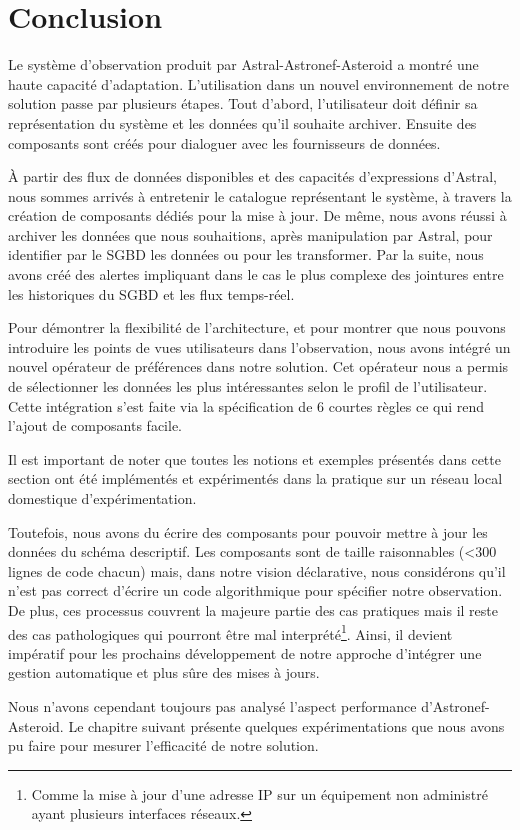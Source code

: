\section{Conclusion}\label{sec:valid:domvision:conclusion}
Le système d'observation produit par Astral-Astronef-Asteroid a montré une haute capacité d'adaptation. L'utilisation dans un nouvel environnement de notre solution passe par plusieurs étapes. Tout d'abord, l'utilisateur doit définir sa représentation du système et les données qu'il souhaite archiver. Ensuite des composants sont créés pour dialoguer avec les fournisseurs de données. 

À partir des flux de données disponibles et des capacités d'expressions d'Astral, nous sommes arrivés à entretenir le catalogue représentant le système, à travers la création de composants dédiés pour la mise à jour. De même, nous avons réussi à archiver les données que nous souhaitions, après manipulation par Astral, pour identifier par le SGBD les données ou pour les transformer. Par la suite, nous avons créé des alertes impliquant dans le cas le plus complexe des jointures entre les historiques du SGBD et les flux temps-réel.

Pour démontrer la flexibilité de l'architecture, et pour montrer que nous pouvons introduire les points de vues utilisateurs dans l'observation, nous avons intégré un nouvel opérateur de préférences dans notre solution. Cet opérateur nous a permis de sélectionner les données les plus intéressantes selon le profil de l'utilisateur. Cette intégration s'est faite via la spécification de 6 courtes règles ce qui rend l'ajout de composants facile.

Il est important de noter que toutes les notions et exemples présentés dans cette section ont été implémentés et expérimentés dans la pratique sur un réseau local domestique d'expérimentation.

Toutefois, nous avons du écrire des composants pour pouvoir mettre à jour les données du schéma descriptif. Les composants sont de taille raisonnables (<300 lignes de code chacun) mais, dans notre vision déclarative, nous considérons qu'il n'est pas correct d'écrire un code algorithmique pour spécifier notre observation. De plus, ces processus couvrent la majeure partie des cas pratiques mais il reste des cas pathologiques qui pourront être mal interprété\footnote{Comme la mise à jour d'une adresse IP sur un équipement non administré ayant plusieurs interfaces réseaux.}. Ainsi, il devient impératif pour les prochains développement de notre approche d'intégrer une gestion automatique et plus sûre des mises à jours.

Nous n'avons cependant toujours pas analysé l'aspect performance d'Astronef-Asteroid. Le chapitre suivant présente quelques expérimentations que nous avons pu faire pour mesurer l'efficacité de notre solution.